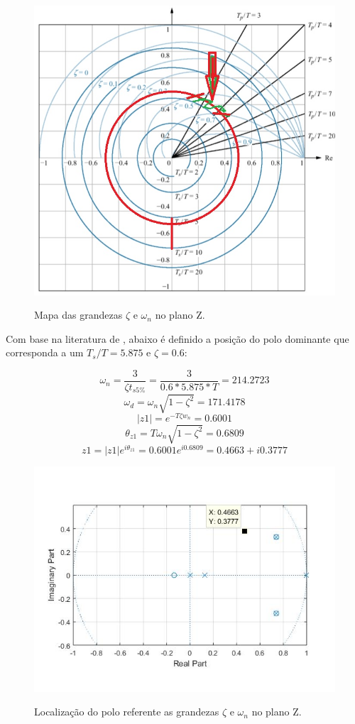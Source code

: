 \documentclass[
	article,			%
	11pt,				%
	oneside,			%
	a4paper,			%
	english,			%
	brazil,				%
	sumario=tradicional
	]{abntex2}
\begin{document}
\begin{figure}[htb!]
	\centering
	\caption{Mapa das grandezas $\zeta$ e $\omega_n$ no plano Z.}
	\includegraphics[scale=0.7]{./img/zMap_wn_Zeta.JPG}
	\label{fig:zMap_wn_Zeta}
\end{figure}

\pagebreak

Com base na literatura de , abaixo é definido a posição do polo dominante que corresponda a um $T_s/T = 5.875$ e $\zeta = 0.6$:

$$\omega_n=\frac{3}{\zeta t_{s5\%}}=\frac{3}{0.6*5.875*T}=214.2723$$
$$\omega_d=\omega_n\sqrt{1-\zeta^2}=171.4178$$
$$|z1|=e^{-T \zeta w_n}=0.6001$$
$$\theta_{z1}=T\omega_n\sqrt{1-\zeta^2}=0.6809$$
$$z1=|z1|e^{i\theta_{z1}}=0.6001e^{i0.6809}=0.4663+i0.3777$$

\begin{figure}[htb!]
	\centering
	\caption{Localização do polo referente as grandezas $\zeta$ e $\omega_n$ no plano Z.}
	\includegraphics[scale=0.8]{./img/poloDominante.JPG}
	\label{fig:poloDominante}
\end{figure}
\end{document}
